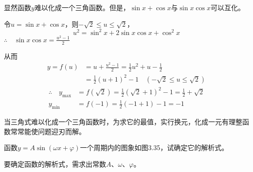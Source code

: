 \begin{analyze}
显然函数$y$难以化成一个三角函数。但是，$\sin x+\cos x$与$\sin x\cos x$可以互化。

\end{analyze}

\begin{solution}
    令$u=\sin x+\cos x$，则$-\sqrt{2}\le u\le \sqrt{2}$，
\[u^2=\sin^2x+2\sin x\cos x+\cos^2x\]
$\therefore\quad \sin x\cos x=\frac{u^2-1}{2}$

从而
\[\begin{split}
    y=f(u)&=u+\frac{u^2-1}{2}=\frac{1}{2}u^2+u-\frac{1}{2}\\
    &=\frac{1}{2}(u+1)^2-1\quad \left(-\sqrt{2}\le u\le \sqrt{2}\right)
\end{split}\]
\[\begin{split}
    \therefore\quad y_{\max}&=f(\sqrt{2})=\frac{1}{2}(\sqrt{2}+1)^2-1=\frac{1}{2}+\sqrt{2}\\
    y_{\min}&=f(-1)=\frac{1}{2}(-1+1)-1=-1
\end{split}\]
\end{solution}

\begin{remark}
    当三角式难以化成一个三角函数时，为求它的最值，实行换元，化成一元有理整函数常常能使问题迎刃而解。
\end{remark}

\begin{example}
函数$y=A\sin(\omega x+\varphi)$一个周期内的图象如图3.35，试确定它的解析式。
\begin{figure}[htp]
    \centering
{}
    \caption{}
\end{figure}
\end{example}

\begin{analyze}
    要确定函数的解析式，需求出常数$A$、$\omega$、$\varphi$。
\end{analyze}

